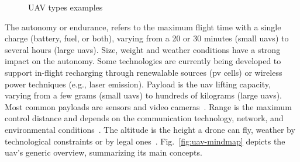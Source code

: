 \begin{figure}[htb!]
  \medskip %


  \caption{UAV types examples}
  \label{fig:uav-types}
\end{figure}
%

The autonomy or endurance, refers to the maximum flight time with a
single charge (battery, fuel, or both), varying from a 20 or 30 minutes (small \glspl{uav}) to several
hours (large \glspl{uav}). Size, weight and weather conditions have a strong
impact on the autonomy. Some technologies are currently being developed to
support in-flight recharging through renewalable sources (\gls{pv} cells) or
wireless power techniques (e.g., laser emission)\cite{mohsan2022towards,mohsan_comprehensive_2022}.
Payload is the \gls{uav} lifting capacity,
varying from a few grams (small \glspl{uav}) to hundreds of kilograms (large
\glspl{uav}). Most common payloads are sensors and video
cameras~\cite{mohsan2022towards}.
Range is the maximum control distance and depends on the communication technology, network, and environmental conditions~\cite{mohsan2022towards}.
The altitude is the height a drone can fly, weather by
technological constraints or by legal ones~\cite{mohsan2022towards}.
%
Fig.~\ref{fig:uav-mindmap} depicts the \gls{uav}'s
generic overview, summarizing its main concepts.
%
%
